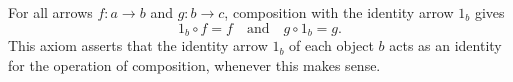 For all arrows $f: a \rightarrow b$ and $g: b \rightarrow c$, composition with the identity arrow $1_b$ gives
$$1_b \circ f = f \quad \text{and} \quad g \circ 1_b = g.$$
This axiom asserts that the identity arrow $1_b$ of each object $b$ acts as an identity for the operation of composition, whenever this makes sense.
